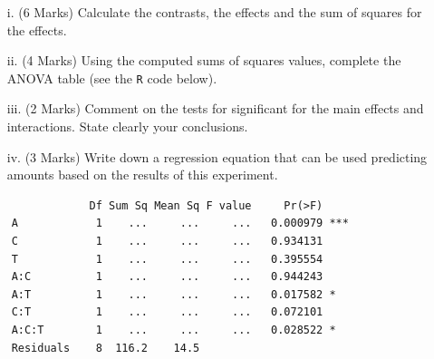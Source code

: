 \documentclass[a4paper,12pt]{article}
\begin{document}
\newpage


\begin{itemize}
	\item[i.] (6 Marks) Calculate the contrasts, the effects and the sum of squares for the effects.
	\item[ii.] (4 Marks) Using the computed sums of squares values, complete the ANOVA table (see the \texttt{R} code below).
	\item[iii.] (2 Marks) Comment on the tests for significant for the main effects and interactions. State clearly your conclusions.
	\item[iv.] (3 Marks) Write down a  regression equation that can be used predicting amounts based on the results of this experiment.
\end{itemize}

{
\large
\begin{framed}
	\begin{verbatim}
	            Df Sum Sq Mean Sq F value     Pr(>F)    
	A            1    ...     ...     ...   0.000979 ***
	C            1    ...     ...     ...   0.934131    
	T            1    ...     ...     ...   0.395554 
	A:C          1    ...     ...     ...   0.944243    
	A:T          1    ...     ...     ...   0.017582 *
	C:T          1    ...     ...     ...   0.072101
	A:C:T        1    ...     ...     ...   0.028522 *    
	Residuals    8  116.2    14.5                      
	\end{verbatim}
\end{framed}
}
\end{document}
